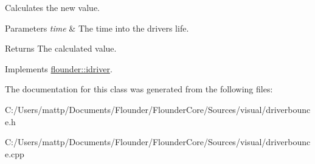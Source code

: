 Calculates the new value. 


\begin{DoxyParams}{Parameters}
{\em time} & The time into the drivers life. \\
\hline
\end{DoxyParams}
\begin{DoxyReturn}{Returns}
The calculated value. 
\end{DoxyReturn}


Implements \hyperlink{classflounder_1_1idriver_a034c4159dc98c4c37ffdfaae64e4a16d}{flounder\+::idriver}.



The documentation for this class was generated from the following files\+:\begin{DoxyCompactItemize}
\item 
C\+:/\+Users/mattp/\+Documents/\+Flounder/\+Flounder\+Core/\+Sources/visual/driverbounce.\+h\item 
C\+:/\+Users/mattp/\+Documents/\+Flounder/\+Flounder\+Core/\+Sources/visual/driverbounce.\+cpp\end{DoxyCompactItemize}

